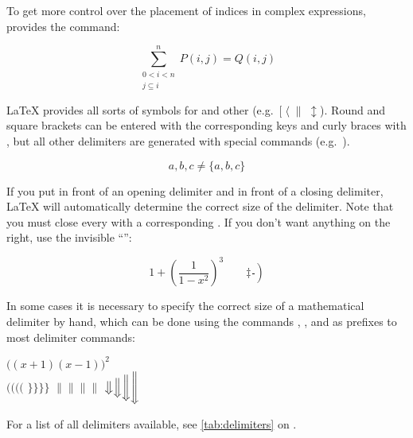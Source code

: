 To get more control over the placement of indices in complex
expressions,  provides the  command:
\begin{example}
\begin{equation*}
\sum^n_{\substack{0<i<n \\ 
        j\subseteq i}}
   P(i,j) = Q(i,j)
\end{equation*}
\end{example}

\LaTeX{} provides all sorts of symbols for \emph{} and other
\emph{} (e.g.~$[\;\langle\;\|\;\updownarrow$). %
Round and square brackets can be entered with the corresponding keys and
curly braces with \csi{\{}, but all other delimiters are generated with
special commands (e.g.~).
\begin{example}
\begin{equation*}
{a,b,c} \neq \{a,b,c\}
\end{equation*}
\end{example}

If you put  in front of an opening delimiter and
 in front of a closing delimiter, \LaTeX{} will automatically
determine the correct size of the delimiter. Note that you must close
every  with a corresponding . If you
don't want anything on the right, use the invisible ``'':
\begin{example}
\begin{equation*}
1 + \left(\frac{1}{1-x^{2}}
    \right)^3 \qquad 
\left. \ddagger
  \frac{~}{~}\right)
\end{equation*}
\end{example}

In some cases it is necessary to specify the correct size of a
mathematical delimiter by hand,
which can be done using the commands , ,  and
 as prefixes to most delimiter commands:
\begin{chktexignore}
  \begin{example}
$\Big((x+1)(x-1)\Big)^{2}$\\
$\big( \Big( \bigg( \Bigg($ 
$\big\} \Big\} \bigg\} \Bigg\}$ 
$\big\| \Big\| \bigg\| \Bigg\|$ 
$\big\Downarrow \Big\Downarrow 
\bigg\Downarrow \Bigg\Downarrow$
\end{example}
\end{chktexignore}

For a list of all delimiters available, see \autoref{tab:delimiters} on .

